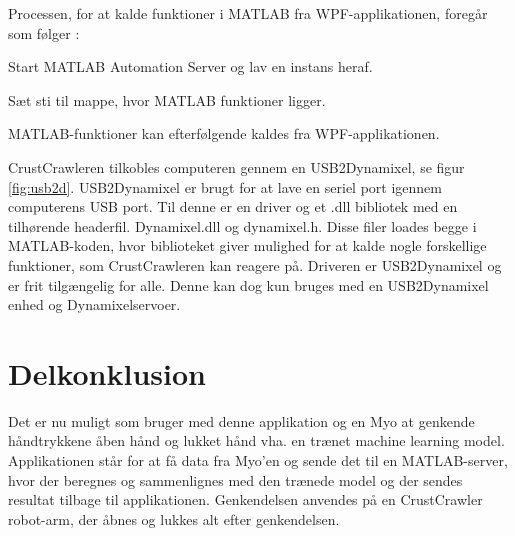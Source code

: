 
Processen, for at kalde funktioner i MATLAB fra WPF-applikationen, foregår som følger \citep{RefWorks:15}:
\begin{myEnumerate}
	\item Start MATLAB Automation Server og lav en instans heraf.
	\item Sæt sti til mappe, hvor MATLAB funktioner ligger.
	\item MATLAB-funktioner kan efterfølgende kaldes fra WPF-applikationen.
\end{myEnumerate}


CrustCrawleren tilkobles computeren gennem en USB2Dynamixel, se figur \ref{fig:usb2d}. USB2Dynamixel er brugt for at lave en seriel port igennem computerens USB port. Til denne er en driver og et .dll bibliotek med en tilhørende headerfil. Dynamixel.dll og dynamixel.h. Disse filer loades begge i MATLAB-koden, hvor biblioteket giver mulighed for at kalde nogle forskellige funktioner, som CrustCrawleren kan reagere på. Driveren er USB2Dynamixel \citep{agaverobot} og er frit tilgængelig for alle. Denne kan dog kun bruges med en USB2Dynamixel enhed og Dynamixelservoer.

\section{Delkonklusion}
Det er nu muligt som bruger med denne applikation og en Myo at genkende håndtrykkene åben hånd og lukket hånd vha. en trænet machine learning model. Applikationen står for at få data fra Myo'en og sende det til en MATLAB-server, hvor der beregnes og sammenlignes med den trænede model og der sendes resultat tilbage til applikationen. Genkendelsen anvendes på en CrustCrawler robot-arm, der åbnes og lukkes alt efter genkendelsen.